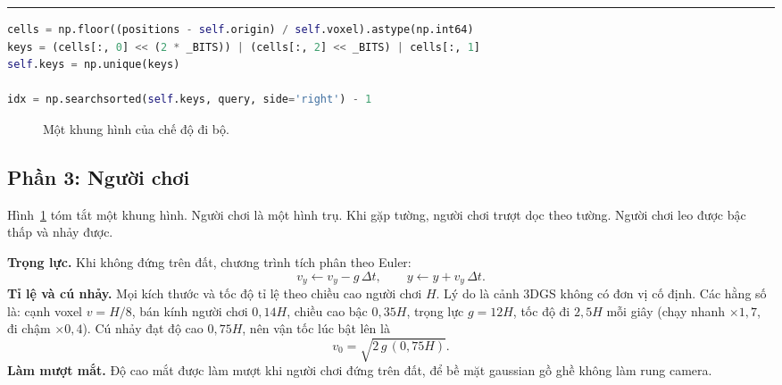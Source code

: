\documentclass[9pt,twocolumn,a4paper]{extarticle}
\newenvironment{codebox}{\par\vspace{5pt}\noindent\begin{minipage}{\columnwidth}\hrule height 0.8pt\vspace{2pt}}{\end{minipage}\par\vspace{5pt}\noindent\ignorespaces}
\newcommand{\code}[1]{\texttt{#1}}
\begin{document}
\begin{codebox}
\begin{lstlisting}[language=Python,caption={\code{core/physics.py}, \code{CollisionWorld}: khóa voxel và tìm mặt đất},label={lst:voxel}]
cells = np.floor((positions - self.origin) / self.voxel).astype(np.int64)
keys = (cells[:, 0] << (2 * _BITS)) | (cells[:, 2] << _BITS) | cells[:, 1]
self.keys = np.unique(keys)

idx = np.searchsorted(self.keys, query, side='right') - 1
\end{lstlisting}
\end{codebox}

\begin{figure}[H]
\centering
{}
\caption{Một khung hình của chế độ đi bộ.}
\label{fig:t5}
\end{figure}

\subsection{Phần 3: Người chơi}
Hình~\ref{fig:t5} tóm tắt một khung hình. Người chơi là một hình trụ. Khi gặp tường, người chơi trượt dọc theo tường. Người chơi leo được bậc thấp và nhảy được.

\textbf{Trọng lực.} Khi không đứng trên đất, chương trình tích phân theo Euler:
\begin{equation}
v_y \leftarrow v_y - g\,\Delta t,
\qquad
y \leftarrow y + v_y\,\Delta t.
\label{eq:euler}
\end{equation}
\textbf{Tỉ lệ và cú nhảy.} Mọi kích thước và tốc độ tỉ lệ theo chiều cao người chơi $H$. Lý do là cảnh 3DGS không có đơn vị cố định. Các hằng số là: cạnh voxel $v=H/8$, bán kính người chơi $0{,}14H$, chiều cao bậc $0{,}35H$, trọng lực $g=12H$, tốc độ đi $2{,}5H$ mỗi giây (chạy nhanh $\times1{,}7$, đi chậm $\times0{,}4$). Cú nhảy đạt độ cao $0{,}75H$, nên vận tốc lúc bật lên là
\begin{equation}
v_0=\sqrt{2\,g\,(0{,}75H)}.
\label{eq:jump}
\end{equation}
\textbf{Làm mượt mắt.} Độ cao mắt được làm mượt khi người chơi đứng trên đất, để bề mặt gaussian gồ ghề không làm rung camera.
\end{document}
